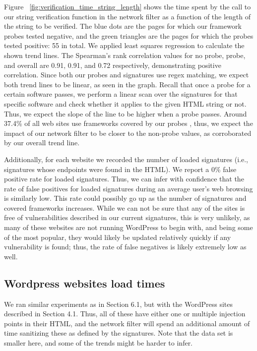  Figure ~\ref{fig:verification_time_string_length} shows the time spent by the call to our string verification function in the network filter as a function of the length of the string to be verified. The blue dots are the pages for which our framework probes tested negative, and the green triangles are the pages for which the probes tested positive: 55 in total. We applied least squares regression to calculate the shown trend lines. The Spearman's rank correlation values for no probe, probe, and overall are 0.91, 0.91, and 0.72 respectively, demonstrating positive correlation. Since both our probes and signatures use regex matching, we expect both trend lines to be linear, as seen in the graph. Recall that once a probe for a certain software passes, we perform a linear scan over the signatures for that specific software and check whether it applies to the given HTML string or not. Thus, we expect the slope of the line to be higher when a probe passes. Around 37.4\% of all web sites use frameworks covered by our probes \cite{w3stats}, thus, we expect the impact of our network filter to be closer to the non-probe values, as corroborated by our overall trend line.



Additionally, for each website we recorded the number of loaded signatures (i.e., signatures whose endpoints were found in the HTML). We report a 0\% false positive rate for loaded signatures. Thus, we can infer with confidence that the rate of false positives for loaded signatures during an average user's web browsing is similarly low. This rate could possibly go up as the number of signatures and covered frameworks increases. While we can not be sure that any of the sites is free of vulnerabilities described in our current signatures, this is very unlikely, as many of these websites are not running WordPress to begin with, and being some of the most popular, they would likely be updated relatively quickly if any vulnerability is found; thus, the rate of false negatives is likely extremely low as well.

\subsection{Wordpress websites load times} \label{wordpress_sites}

We ran similar experiments as in Section 6.1, but with the WordPress sites described in Section 4.1. Thus, all of these have either one or multiple injection points in their HTML, and the network filter will spend an additional amount of time sanitizing these as defined by the signatures. Note that the data set is smaller here, and some of the trends might be harder to infer. 

